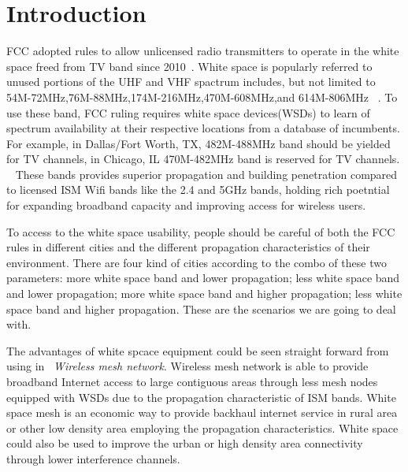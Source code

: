 
\section{Introduction}
\label{sec:introduction}

FCC adopted rules to allow unlicensed radio transmitters to operate in the white space freed from TV band since 2010~\cite{fccwhitespace}. White space is popularly referred to unused portions of the UHF and VHF spactrum includes, but not limited to 54M-72MHz,76M-88MHz,174M-216MHz,470M-608MHz,and 614M-806MHz ~\cite{whitespacewiki}.
To use these band, FCC ruling requires white space devices(WSDs) to learn of spectrum availability at their respective locations from a database of incumbents. For example, in Dallas/Fort Worth, TX, 482M-488MHz band should be yielded for TV channels, in Chicago, IL 470M-482MHz band is reserved for TV channels. ~\cite{broadband}
 These bands provides superior propagation and building penetration compared to licensed ISM Wifi bands like the 2.4 and 5GHz bands, holding rich poetntial for expanding broadband capacity and improving access for wireless users.

To access to the white space usability, people should be careful of both the FCC rules in different cities and the different propagation characteristics of their environment.
There are four kind of cities according to the combo of these two parameters: 
more white space band and lower propagation; less white space band and lower propagation; more white space band and higher propagation; less white space band and higher propagation.
These are the scenarios we are going to deal with.

The advantages of white spcace equipment could be seen straight forward from using in ~\emph{Wireless mesh network}.
Wireless mesh network is able to provide broadband Internet access to large contiguous areas through less mesh nodes equipped with WSDs due to the propagation characteristic of ISM bands. White space mesh is an economic way to provide backhaul internet service in rural area or other low density area employing the propagation characteristics.
White space could also be used to improve the urban or high density area connectivity through lower interference channels. 

